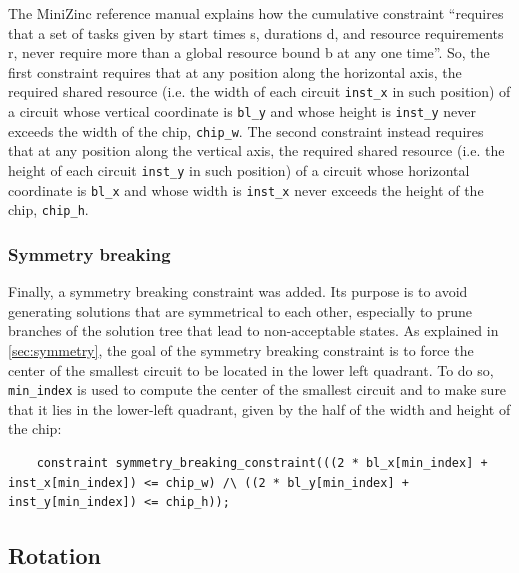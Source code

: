 \documentclass[a4paper, 12pt]{article}
\begin{document}
The MiniZinc reference manual explains how the cumulative constraint ``requires that a set of tasks given by start times s, durations d, and resource requirements r, never require more than a global resource bound b at any one time''. So, the first constraint requires that at any position along the horizontal axis, the required shared resource (i.e. the width of each circuit \verb|inst_x| in such position) of a circuit whose vertical coordinate is \verb|bl_y| and whose height is \verb|inst_y| never exceeds the width of the chip, \verb|chip_w|. The second constraint instead requires that at any position along the vertical axis, the required shared resource (i.e. the height of each circuit \verb|inst_y| in such position) of a circuit whose horizontal coordinate is \verb|bl_x| and whose width is \verb|inst_x| never exceeds the height of the chip, \verb|chip_h|.


\subsubsection{Symmetry breaking}\label{sec:cp-symmetry}

Finally, a symmetry breaking constraint was added. Its purpose is to avoid generating solutions that are symmetrical to each other, especially to prune branches of the solution tree that lead to non-acceptable states. As explained in \cref{sec:symmetry}, the goal of the symmetry breaking constraint is to force the center of the smallest circuit to be located in the lower left quadrant. To do so, \verb|min_index| is used to compute the center of the smallest circuit and to make sure that it lies in the lower-left quadrant, given by the half of the width and height of the chip:
\begin{verbatim}
    constraint symmetry_breaking_constraint(((2 * bl_x[min_index] + inst_x[min_index]) <= chip_w) /\ ((2 * bl_y[min_index] + inst_y[min_index]) <= chip_h));
\end{verbatim}


\subsection{Rotation}
\end{document}
